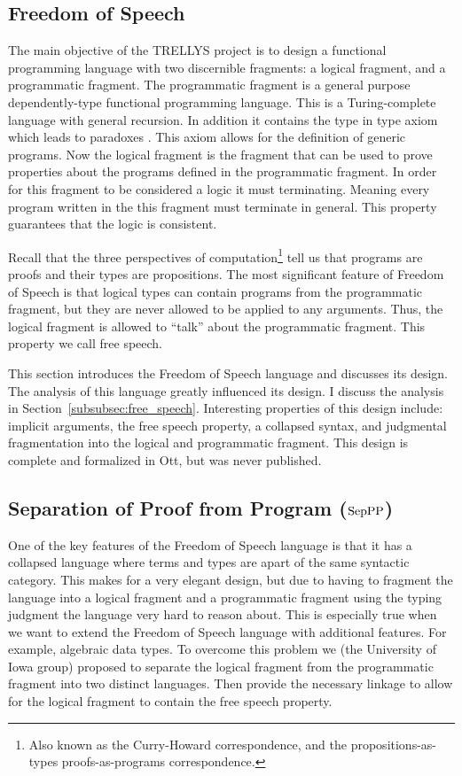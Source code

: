 \subsection{Freedom of Speech}
\label{subsec:freedom_of_speech}
The main objective of the TRELLYS project is to design a functional
programming language with two discernible fragments: a logical
fragment, and a programmatic fragment.  The programmatic fragment is a
general purpose dependently-type functional programming language.
This is a Turing-complete language with general recursion.  In
addition it contains the type in type axiom which leads to paradoxes
\cite{Coquand:1986,Coquand:1994}.  This axiom allows for the
definition of generic programs.  Now the logical fragment is the
fragment that can be used to prove properties about the programs
defined in the programmatic fragment.  In order for this fragment to
be considered a logic it must terminating.  Meaning every program
written in the this fragment must terminate in general.  This property
guarantees that the logic is consistent.

Recall that the three perspectives of computation\footnote{Also known
  as the Curry-Howard correspondence, and the propositions-as-types
  proofs-as-programs correspondence.} tell us that programs are proofs
and their types are propositions.  The most significant feature of
Freedom of Speech is that logical types can contain programs from the
programmatic fragment, but they are never allowed to be applied to any
arguments.  Thus, the logical fragment is allowed to ``talk'' about
the programmatic fragment.  This property we call free speech.

This section introduces the Freedom of Speech language and discusses
its design.  The analysis of this language greatly influenced its
design.  I discuss the analysis in
Section~\ref{subsubsec:free_speech}.  Interesting properties of this
design include: implicit arguments, the free speech property, a
collapsed syntax, and judgmental fragmentation into the logical and
programmatic fragment.  This design is complete and formalized in Ott,
but was never published.

\subsection{Separation of Proof from Program ($\text{SepPP}$) }
\label{subsec:separation_of_proof_from_program}
One of the key features of the Freedom of Speech language is that it
has a collapsed language where terms and types are apart of the same
syntactic category.  This makes for a very elegant design, but due to
having to fragment the language into a logical fragment and a
programmatic fragment using the typing judgment the language very hard
to reason about.  This is especially true when we want to extend the
Freedom of Speech language with additional features.  For example,
algebraic data types.  To overcome this problem we (the University of
Iowa group) proposed to separate the logical fragment from the
programmatic fragment into two distinct languages. Then provide the
necessary linkage to allow for the logical fragment to contain the
free speech property.  

